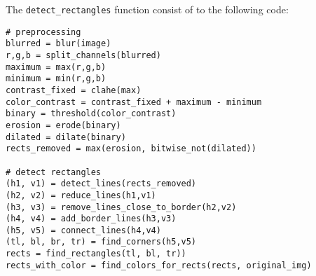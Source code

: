 The \texttt{detect\_rectangles} function consist of to the following code:
\begin{lstlisting}
# preprocessing
blurred = blur(image)
r,g,b = split_channels(blurred)
maximum = max(r,g,b)
minimum = min(r,g,b)
contrast_fixed = clahe(max)
color_contrast = contrast_fixed + maximum - minimum
binary = threshold(color_contrast)
erosion = erode(binary)
dilated = dilate(binary)
rects_removed = max(erosion, bitwise_not(dilated))

# detect rectangles
(h1, v1) = detect_lines(rects_removed)
(h2, v2) = reduce_lines(h1,v1)
(h3, v3) = remove_lines_close_to_border(h2,v2)
(h4, v4) = add_border_lines(h3,v3)
(h5, v5) = connect_lines(h4,v4)
(tl, bl, br, tr) = find_corners(h5,v5)
rects = find_rectangles(tl, bl, tr))
rects_with_color = find_colors_for_rects(rects, original_img)
\end{lstlisting}
